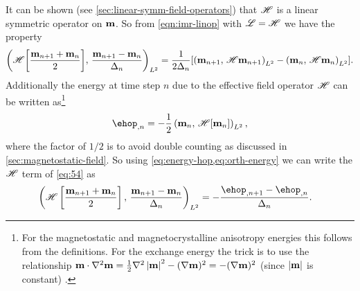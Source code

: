 It can be shown (see \eg \cref{sec:linear-symm-field-operators}) that $\mathscr{H}$ is a linear symmetric operator on $\boldsymbol{\mathrm{m}}$.
So from \cref{eqn:imr-linop} with $\mathscr{L} = \mathscr{H}$ we have the property
\begin{equation}
  \left(\mathscr{H} {\left[ \frac{\boldsymbol{\mathrm{m}}_{n+1} + \boldsymbol{\mathrm{m}}_n}{2} \right]},\,  \frac{\boldsymbol{\mathrm{m}}_{n+1} - \boldsymbol{\mathrm{m}}_n}{\Delta_{n}}  \right)_{L^2}
  = \frac{1}{2\Delta_{n}} {\left[  \left(\boldsymbol{\mathrm{m}}_{n+1},\, \mathscr{H} \boldsymbol{\mathrm{m}}_{n+1} \right)_{L^2} - \left(\boldsymbol{\mathrm{m}}_{n},\, \mathscr{H} \boldsymbol{\mathrm{m}}_{n} \right)_{L^2} \right]}.
  \label{eq:orth-energy}
\end{equation}
Additionally the energy at time step $n$ due to the effective field operator $\mathscr{H}$ can be written as\footnote{For the magnetostatic and magnetocrystalline anisotropy energies this follows from the definitions.
  For the exchange energy the trick is to use the relationship $\boldsymbol{\mathrm{m}} \cdot \nabla^2 \boldsymbol{\mathrm{m}} = \frac{1}{2} \nabla^2 \left|{\boldsymbol{\mathrm{m}}} \right|^2 - (\nabla \boldsymbol{\mathrm{m}})^2 = - (\nabla \boldsymbol{\mathrm{m}})^2$ (since $\left|{\boldsymbol{\mathrm{m}}} \right|$ is constant) \cite[179]{Aharoni1996}.}
\begin{equation}
  \label{eq:energy-hop}
  \ehop_{,n} = - \frac{1}{2}\ltip{\mv_n}{\hopb{\mv_n}},
\end{equation}
where the factor of $1/2$ is to avoid double counting as discussed in \cref{sec:magnetostatic-field}.
So using \cref{eq:energy-hop,eq:orth-energy} we can write the $\mathscr{H}$ term of \cref{eq:54} as
\begin{equation}
  \begin{aligned}
    \ltip{\mphop}{\mpdmdt} &= -\frac{\ehop_{,n+1} - \ehop_{,n}}{\dtn}.
  \end{aligned}
  \label{eq:50}
\end{equation}

